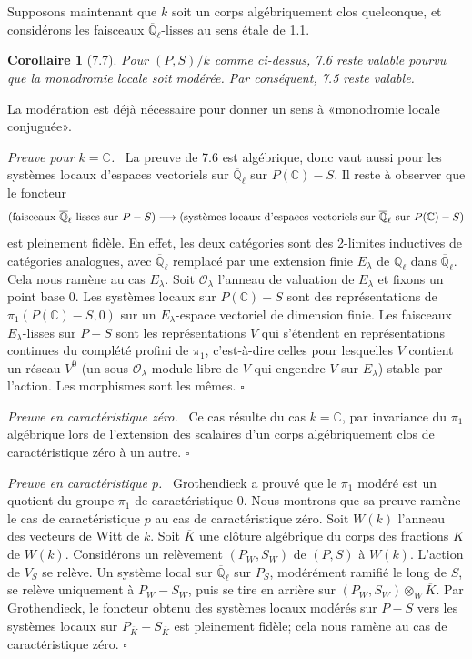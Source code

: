 \documentclass[10pt]{article}
\newcommand{\Ql}{\overline{\mathbb Q}_{\ell}}
\newcommand{\C}{\mathbb C}
\newcommand{\Q}{\mathbb Q}
\newcommand{\OO}{\mathcal O}
\theoremstyle{deligne}
\newtheorem*{corollary*}{Corollaire}
\newenvironment{proofdel}[1][Preuve.]{\textit{#1}\ }{\hfill$\square$}
\begin{document}
Supposons maintenant que $k$ soit un corps algébriquement clos quelconque, et considérons les faisceaux $\Ql$-lisses au sens \'{e}tale de 1.1.

\begin{corollary*}[7.7]
Pour $(P,S)/k$ comme ci-dessus, 7.6 reste valable pourvu que la monodromie locale soit modérée. Par conséquent, 7.5 reste valable.
\end{corollary*}

La modération est déjà nécessaire pour donner un sens à «monodromie locale conjuguée».

\begin{proofdel}[Preuve pour $k=\C$.]
La preuve de 7.6 est algébrique, donc vaut aussi pour les systèmes locaux d'espaces vectoriels sur $\Ql$ sur $P(\C)-S$. Il reste à observer que le foncteur
\[
(\hbox{faisceaux }\Ql\hbox{-lisses sur }P-S)\longrightarrow
(\hbox{systèmes locaux d'espaces vectoriels sur }\Ql\hbox{ sur }P(\C)-S)
\]
est pleinement fid\`ele. En effet, les deux catégories sont des 2-limites inductives de catégories analogues, avec $\Ql$ remplacé par une extension finie $E_\lambda$ de $\Q_\ell$ dans $\Ql$. Cela nous ramène au cas $E_\lambda$. Soit $\OO_\lambda$ l'anneau de valuation de $E_\lambda$ et fixons un point base $0$. Les systèmes locaux sur $P(\C)-S$ sont des représentations de $\pi_1(P(\C)-S,0)$ sur un $E_\lambda$-espace vectoriel de dimension finie. Les faisceaux $E_\lambda$-lisses sur $P-S$ sont les représentations $V$ qui s'étendent en représentations continues du complété profini de $\pi_1$, c'est-à-dire celles pour lesquelles $V$ contient un réseau $V^0$ (un sous-$\OO_\lambda$-module libre de $V$ qui engendre $V$ sur $E_\lambda$) stable par l'action. Les morphismes sont les mêmes.
\end{proofdel}

\begin{proofdel}[Preuve en caractéristique zéro.]
Ce cas résulte du cas $k=\C$, par invariance du $\pi_1$ algébrique lors de l'extension des scalaires d'un corps algébriquement clos de caractéristique zéro à un autre.
\end{proofdel}

\begin{proofdel}[Preuve en caractéristique $p$.]
Grothendieck a prouvé que le $\pi_1$ modéré est un quotient du groupe $\pi_1$ de caractéristique $0$. Nous montrons que sa preuve ramène le cas de caractéristique $p$ au cas de caractéristique zéro. Soit $W(k)$ l'anneau des vecteurs de Witt de $k$. Soit $\overline K$ une clôture algébrique du corps des fractions $K$ de $W(k)$. Considérons un relèvement $(P_W,S_W)$ de $(P,S)$ à $W(k)$. L'action de $V_S$ se relève. Un système local sur $\Ql$ sur $P_S$, modérément ramifié le long de $S$, se relève uniquement à $P_W-S_W$, puis se tire en arrière sur $(P_W,S_W)\otimes_W\overline K$. Par Grothendieck, le foncteur obtenu des systèmes locaux modérés sur $P-S$ vers les systèmes locaux sur $P_{\overline K}-S_{\overline K}$ est pleinement fid\`ele; cela nous ramène au cas de caractéristique zéro.
\end{proofdel}
\end{document}
